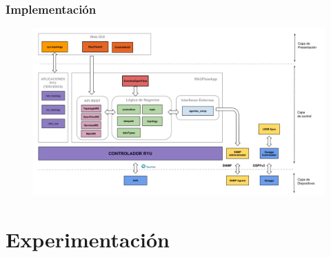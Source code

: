 \documentclass{beamer}
\begin{document}
\begin{frame}
\frametitle{Implementaci\'on} 

\begin{figure}[H]
\centering
\includegraphics[width=1.0\textwidth]{imagenes/rauflowarquitectura.png}
\end{figure}

\end{frame}

\section{Experimentaci\'on} 
\frame{\tableofcontents[currentsection]}
\end{document}
